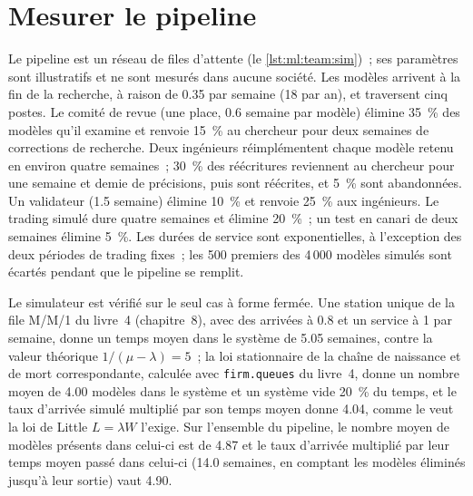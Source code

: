 \section{Mesurer le pipeline}

Le pipeline est un réseau de files d'attente (le \cref{lst:ml:team:sim})~; ses paramètres sont illustratifs et ne sont mesurés dans aucune société. Les modèles arrivent à la fin de la recherche, à raison de 0.35 par semaine (18 par an), et
traversent cinq postes. Le comité de revue (une place, 0.6 semaine par modèle) élimine 35~\% des modèles qu'il examine et renvoie 15~\% au chercheur
pour deux semaines de corrections de recherche. Deux ingénieurs réimplémentent chaque modèle retenu en environ quatre semaines~; 30~\% des réécritures reviennent au chercheur
pour une semaine et demie de précisions, puis sont réécrites, et 5~\% sont abandonnées. Un validateur (1.5 semaine)
élimine 10~\% et renvoie 25~\% aux ingénieurs. Le trading simulé dure quatre semaines et élimine 20~\%~; un test en canari de deux semaines élimine 5~\%. Les durées de service
sont exponentielles, à l'exception des deux périodes de trading fixes~; les 500 premiers des 4\,000 modèles simulés sont écartés
pendant que le pipeline se remplit.

Le simulateur est vérifié sur le seul cas à forme fermée. Une station unique de la file M/M/1 du livre~4 (chapitre~8), avec des arrivées
à 0.8 et un service à 1 par semaine, donne un temps moyen dans le système de 5.05 semaines, contre la valeur théorique $1/(\mu-\lambda)=5$~; la
loi stationnaire de la chaîne de naissance et de mort correspondante, calculée avec \texttt{firm.queues} du livre~4, donne un nombre moyen de 4.00 modèles dans
le système et un système vide 20~\% du temps, et le taux d'arrivée simulé multiplié par son temps moyen donne 4.04, comme le veut la loi de Little
$L=\lambda W$ l'exige. Sur l'ensemble du pipeline, le nombre moyen de modèles présents dans celui-ci est de 4.87 et le taux d'arrivée multiplié par leur
temps moyen passé dans celui-ci (14.0 semaines, en comptant les modèles éliminés jusqu'à leur sortie) vaut 4.90.

